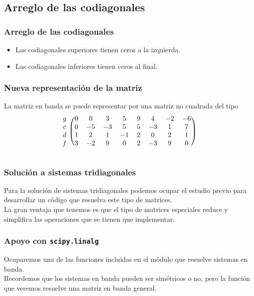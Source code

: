 \subsection{Arreglo de las codiagonales}
\begin{frame}
\frametitle{Arreglo de las codiagonales}
\begin{figure}
    \centering
        
\end{figure}
\begin{itemize}
\item Las codiagonales superiores tienen ceros a la izquierda.
\item Las codiagonales inferiores tienen ceros al final.
\end{itemize}
\end{frame}
\begin{frame}
\frametitle{Nueva representación de la matriz}
La matriz en banda se puede representar por una matriz no cuadrada del tipo
\\
\bigskip
\pause
\begin{align*}
\begin{blockarray}{ccccccccc}
\begin{block}{c(cccccccc)}
g & 0 & 0 & 3 & 5 & 9 & 4 & -2 & -6 \\
c & 0 & -5 & -3 & 5 & 5 & -3 & 1 & 7 \\
d & 1 & 2 & 1 & -1 & 2 & 0 & 2 & 1 \\
f & 3 & -2 & 9 & 0 & 2 & -3 & 9 & 0 \\
\end{block}
\end{blockarray}
\end{align*}
\end{frame}
\begin{frame}
\frametitle{Solución a sistemas tridiagonales}
Para la solución de sistemas tridiagonales podemos ocupar el estudio previo para desarrollar un código que resuelva este tipo de matrices.
\\
\bigskip
La gran ventaja que tenemos es que el tipo de matrices especiales reduce y simplifica las operaciones que se tienen que implementar.
\end{frame}
\begin{frame}
\frametitle{Apoyo con \texttt{scipy.linalg}}
Ocuparemos una de las funciones incluidas en el módulo  que resuelve sistemas en banda.
\\
\bigskip
Recordemos que los sistemas en banda pueden ser simétricos o no, pero la función que veremos resuelve una matriz en banda general.
\end{frame}
